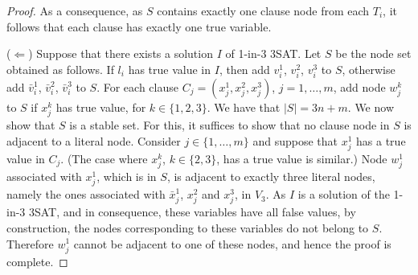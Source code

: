 \documentclass{article}
\theoremstyle{plain}
\theoremstyle{definition}
\begin{document}
\begin{proof}
As a consequence, as $S$ contains exactly one clause node from each $T_i$, it follows that each clause has exactly one true variable.

\noindent($\Leftarrow$) Suppose that there exists a solution $I$ of 1-in-3 3SAT. Let $S$ be the node set obtained as follows. If $l_i$ has true value in $I$, then add $v^1_i$, $v^2_i$, $v^3_i$ to $S$, otherwise add $\bar{v}^1_i$, $\bar{v}^2_i$, $\bar{v}^3_i$ to $S$. For each clause $C_j=(x_j^1,x_j^2,x_j^3)$, $j=1,\dots,m$, add node $w^k_j$ to $S$ if $x_j^k$ has true value, for $k\in\{1,2,3\}$. We have that $|S|=3n+m$. We now show that $S$ is a stable set. For this, it suffices to show that no clause node in $S$ is adjacent to a literal node. Consider $j\in\{1,\dots,m\}$ and suppose that $x_j^1$ has a true value in $C_j$. (The case where $x_j^k$, $k\in\{2,3\}$, has a true value is similar.) Node $w^1_j$ associated with $x_j^1$, which is in $S$, is adjacent to exactly three literal nodes, namely the ones associated with $\bar{x}^1_j$, $x^2_j$ and $x^3_j$, in $V_3$. As $I$ is a solution of the 1-in-3 3SAT, and in consequence, these variables have all false values, by construction, the nodes corresponding to these variables do not belong to $S$. Therefore $w^1_j$ cannot be adjacent to one of these nodes, and hence the proof is complete.
\end{proof}
\end{document}
